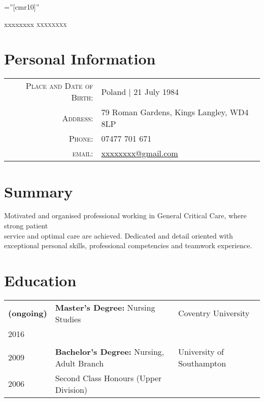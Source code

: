 \documentclass[a4paper,10pt]{article}
\begin{document}
\pagestyle{empty} %

\font\fb=''[cmr10]'' %

\par{\centering
		{\Huge xxxxxxxx \textsc{xxxxxxxx}
	}\bigskip\par}


\section{Personal Information}

\begin{tabular}{rl}
    \textsc{Place and Date of Birth:} & Poland  | 21 July 1984 \\
    \textsc{Address:}   & 79 Roman Gardens, Kings Langley, WD4 8LP \\
    \textsc{Phone:}     & 07477 701 671\\
    \textsc{email:}     & \href{mailto:xxxxxxxx@gmail.com}{xxxxxxxx@gmail.com}
\end{tabular}

\section{Summary}
Motivated and organised professional working in General Critical Care, where strong patient \\
service and optimal care are achieved. Dedicated and detail oriented with \\
exceptional personal skills, professional competencies and teamwork experience. 

\section{Education}
\begin{tabular}{p{1.35cm}p{8cm}l}	
 \textbf{(ongoing)}  & \textbf{Master's Degree:} Nursing Studies & Coventry University \\
\textsc{2016} &  \\
\\
\textsc{2009} & \textbf{Bachelor's Degree:}  Nursing, Adult Branch & University of Southampton\\
\textsc{2006} &  Second Class Honours (Upper Division)  \\
\end{tabular}
\end{document}
